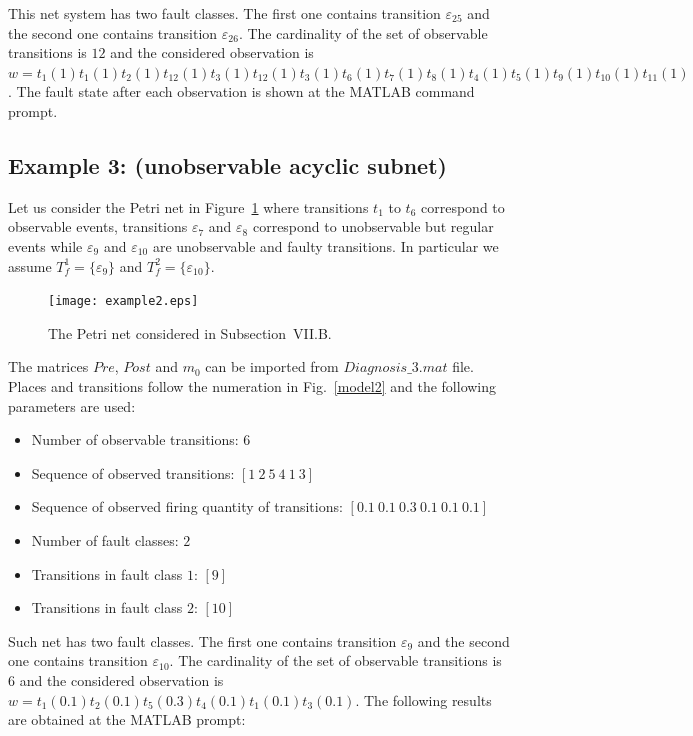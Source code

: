 This net system has two fault classes. The first one contains transition
$\varepsilon_{25}$ and the second one contains transition
$\varepsilon_{26}$. The cardinality of the set of observable
transitions is $12$ and the considered observation is $w= t_1(1)
t_1(1) t_2(1) t_{12}(1) t_3(1) t_{12}(1) t_3(1) t_6(1) t_7(1)t_8(1)
t_4(1) t_5(1) t_9(1) t_{10}(1) t_{11}(1)$. The fault state after each observation is shown at the MATLAB command prompt.

\subsection{Example 3: (unobservable acyclic subnet)}

Let us consider the Petri net in Figure~\ref{fig_new_example2} where
transitions $t_1$ to $t_{6}$ correspond to observable events,
transitions $\varepsilon_{7}$ and $\varepsilon_{8}$ correspond to
unobservable but regular events while $\varepsilon_{9}$ and
$\varepsilon_{10}$ are unobservable and faulty transitions. In
particular we assume $T_f^1=\{\varepsilon_{9}\}$ and
$T_f^2=\{\varepsilon_{10}\}$.

\begin{figure}
\begin{center}
\texttt{[image: example2.eps]}
\end{center}
\caption{The Petri net considered in Subsection~VII.B.}
\label{fig_new_example2}
\end{figure}

The matrices $Pre$, $Post$ and $m_0$ can be imported from
$Diagnosis\_3.mat$ file. Places and transitions follow the
numeration in Fig.~\ref{model2} and the following parameters are used:

\begin{itemize}
\item Number of observable transitions: $6$
\item Sequence of observed transitions: $[1  \   2  \   5  \  4 \    1 \    3 ]$
\item Sequence of observed firing quantity of transitions: $[0.1   \ 0.1  \  0.3  \  0.1  \ 0.1  \  0.1]$
\item Number of fault classes: $2$
\item Transitions in fault class $1$: $[9]$
\item Transitions in fault class $2$: $[10]$
\end{itemize}


Such net has two fault classes. The first one contains transition
$\varepsilon_{9}$ and the second one contains transition
$\varepsilon_{10}$. The cardinality of the set of observable
transitions is $6$ and the considered observation is $w= t_1(0.1)
t_2(0.1) t_5(0.3) t_{4}(0.1) t_1(0.1) t_{3}(0.1)$. The following
results are obtained at the MATLAB prompt:



